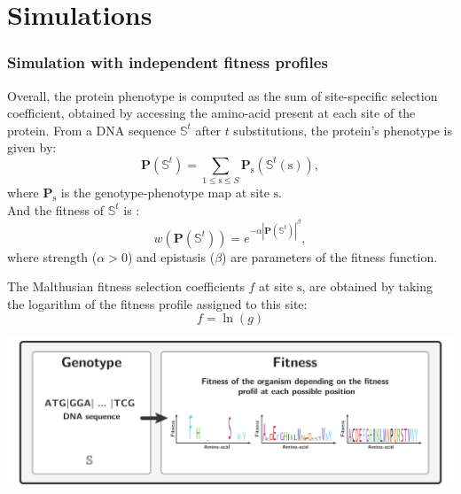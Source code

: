 \documentclass{article}
\newcommand{\Nsite}{S}
\newcommand{\site}{\text{s}}
\newcommand{\phenoGeo}{\bm{P}}
\begin{document}
\part*{Simulations}

\section{Simulation with independent fitness profiles}

Overall, the protein phenotype is computed as the sum of site-specific selection coefficient, obtained by accessing the amino-acid present at each site of the protein.
From a DNA sequence $\mathbb{S}^t$ after $t$ substitutions, the protein's phenotype is given by:
\begin{equation}
\phenoGeo\left(\mathbb{S}^{t}\right) = \sum_{1 \leq \site \leq \Nsite} \phenoGeo_{\site} \left(\mathbb{S}^t(\site) \right),
\end{equation}
where $\phenoGeo_{\site}$ is the genotype-phenotype map at site $\site$.\\

And the fitness of $\mathbb{S}^t$ is : 
\begin{equation}
w\left( \phenoGeo\left(\mathbb{S}^{t}\right) \right) = e^{-\alpha \left| \phenoGeo\left(\mathbb{S}^{t}\right) \right|^{\beta}},
\end{equation}
where strength ($\alpha > 0$) and epistasis ($\beta$) are parameters of the fitness function.

The Malthusian fitness selection coefficients $f$ at site $\site$, are obtained by taking the logarithm of the fitness profile assigned to this site:
\begin{equation}
\label{eq:sitefitness}
f = \ln \left( g \right)
\end{equation}

\begin{center}
	\includegraphics[width=165mm] {artworks/ModelSimuDiv.pdf}
\end{center}
\end{document}
